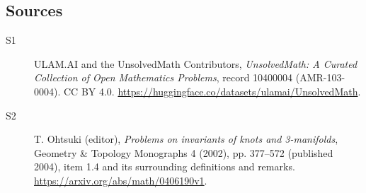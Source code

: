 \documentclass[11pt]{article}
\begin{document}
\subsection{Sources}
\begin{description}
\item[\hypertarget{source:10400004:1}{S1}] ULAM.AI and the UnsolvedMath Contributors, \emph{UnsolvedMath: A Curated Collection of Open Mathematics Problems}, record 10400004 (AMR-103-0004). CC BY 4.0. \url{https://huggingface.co/datasets/ulamai/UnsolvedMath}.
\item[\hypertarget{source:10400004:2}{S2}] T. Ohtsuki (editor), \emph{Problems on invariants of knots and 3-manifolds}, Geometry \& Topology Monographs 4 (2002), pp. 377--572 (published 2004), item 1.4 and its surrounding definitions and remarks. \url{https://arxiv.org/abs/math/0406190v1}.
\end{description}
\label{end:10400004}
\end{document}
